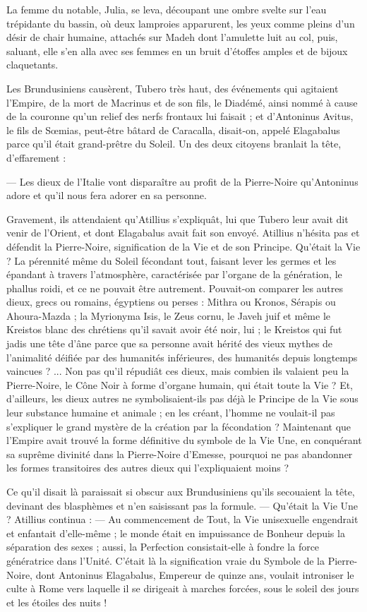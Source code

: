 \documentclass[a4paper, 11pt, oneside, polutonikogreek, french]{article}
\begin{document}
La femme du notable, Julia, se leva, découpant une ombre svelte sur l'eau trépidante du bassin, où deux lamproies apparurent, les yeux comme pleins d'un désir de chair humaine, attachés sur Madeh dont l'amulette luit au col, puis, saluant, elle s'en alla avec ses femmes en un bruit d'étoffes amples et de bijoux claquetants.

Les Brundusiniens causèrent, Tubero très haut, des événements qui agitaient l'Empire, de la mort de Macrinus et de son fils, le Diadémé, ainsi nommé à cause de la couronne qu'un relief des nerfs frontaux lui faisait ; et d'Antoninus Avitus, le fils de Sœmias, peut-être bâtard de Caracalla, disait-on, appelé Elagabalus parce qu'il était grand-prêtre du Soleil. Un des deux citoyens branlait la tête, d'effarement :

--- Les dieux de l'Italie vont disparaître au profit de la Pierre-Noire qu'Antoninus adore et qu'il nous fera adorer en sa personne.

Gravement, ils attendaient qu'Atillius s'expliquât, lui que Tubero leur avait dit venir de l'Orient, et dont Elagabalus avait fait son envoyé. Atillius n'hésita pas et défendit la Pierre-Noire, signification de la Vie et de son Principe. Qu'était la Vie ? La pérennité même du Soleil fécondant tout, faisant lever les germes et les épandant à travers l'atmosphère, caractérisée par l'organe de la génération, le phallus roidi, et ce ne pouvait être autrement. Pouvait-on comparer les autres dieux, grecs ou romains, égyptiens ou perses : Mithra ou Kronos, Sérapis ou Ahoura-Mazda ; la Myrionyma Isis, le Zeus cornu, le Javeh juif et même le Kreistos blanc des chrétiens qu'il savait avoir été noir, lui ; le Kreistos qui fut jadis une tête d'âne parce que sa personne avait hérité des vieux mythes de l'animalité déifiée par des humanités inférieures, des humanités depuis longtemps vaincues ? ... Non pas qu'il répudiât ces dieux, mais combien ils valaient peu la Pierre-Noire, le Cône Noir à forme d'organe humain, qui était toute la Vie ? Et, d'ailleurs, les dieux autres ne symbolisaient-ils pas déjà le Principe de la Vie sous leur substance humaine et animale ; en les créant, l'homme ne voulait-il pas s'expliquer le grand mystère de la création par la fécondation ? Maintenant que l'Empire avait trouvé la forme définitive du symbole de la Vie Une, en conquérant sa suprême divinité dans la Pierre-Noire d'Emesse, pourquoi ne pas abandonner les formes transitoires des autres dieux qui l'expliquaient moins ?

Ce qu'il disait là paraissait si obscur aux Brundusiniens qu'ils secouaient la tête, devinant des blasphèmes et n'en saisissant pas la formule. --- Qu'était la Vie Une ? Atillius continua : --- Au commencement de Tout, la Vie unisexuelle engendrait et enfantait d'elle-même ; le monde était en impuissance de Bonheur depuis la séparation des sexes ; aussi, la Perfection consistait-elle à fondre la force génératrice dans l'Unité. C'était là la signification vraie du Symbole de la Pierre-Noire, dont Antoninus Elagabalus, Empereur de quinze ans, voulait introniser le culte à Rome vers laquelle il se dirigeait à marches forcées, sous le soleil des jours et les étoiles des nuits !
\end{document}

